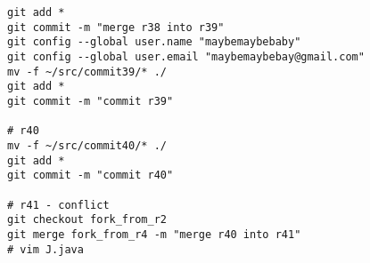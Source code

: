 
\tiny
\begin{verbatim}
git add *
git commit -m "merge r38 into r39"
git config --global user.name "maybemaybebaby"
git config --global user.email "maybemaybebay@gmail.com"
mv -f ~/src/commit39/* ./
git add *
git commit -m "commit r39"

# r40
mv -f ~/src/commit40/* ./
git add *
git commit -m "commit r40"

# r41 - conflict
git checkout fork_from_r2
git merge fork_from_r4 -m "merge r40 into r41"
# vim J.java

\end{verbatim}
\normalsize